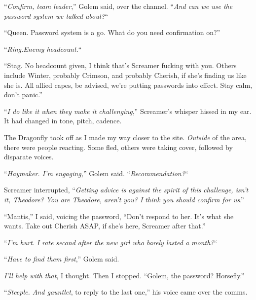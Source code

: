 ``\emph{Confirm, team leader},'' Golem said, over the channel.  ``\emph{And can we use the password system we talked about?}``



``Queen.  Password system is a go.  What do you need confirmation on?''



``\emph{Ring.}\emph{Enemy headcount.}``



``Stag.  No headcount given, I think that's Screamer fucking with you.  Others include Winter, probably Crimson, and probably Cherish, if she's finding us like she is.  All allied capes, be advised, we're putting passwords into effect.  Stay calm, don't panic.''



``\emph{I do like it when they make it challenging},'' Screamer's whisper hissed in my ear.  It had changed in tone, pitch, cadence.



The Dragonfly took off as I made my way closer to the site.  \emph{Outside} of the area, there were people reacting.  Some fled, others were taking cover, followed by disparate voices.



``\emph{Haymaker.  I'm engaging,}'' Golem said.  ``\emph{Recommendation?}``



Screamer interrupted, ``\emph{Getting advice is against the spirit of this challenge, isn't it, Theodore?  You are Theodore, aren't you?  I think you should confirm for us}.''



``Mantis,'' I said, voicing the password,  ``Don't respond to her.  It's what she wants.  Take out Cherish ASAP, if she's here, Screamer after that.''



``\emph{I'm hurt}.  \emph{I rate second after the new girl who barely lasted a month?}``



``\emph{Have to find them first},'' Golem said.



\emph{I'll help with that}, I thought.  Then I stopped.  ``Golem, the password?  Horsefly.''



``\emph{Steeple.  And gauntlet}, to reply to the last one,'' his voice came over the comms.



